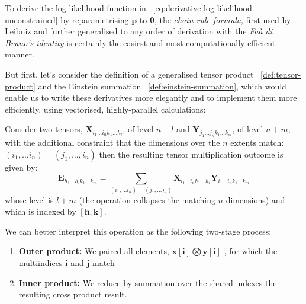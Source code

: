 \documentclass[long, final]{jobim}
\begin{document}
To derive the log-likelihood function in \equationname~\ref{eq:derivative-log-likelihood-unconstrained} by reparametrising $\boldsymbol{p}$ to  $\boldsymbol{\theta}$, the \textit{chain rule formula}, first used by Leibniz and further generalised to any order of derivation with the \textit{Faà di Bruno's identity} is certainly the easiest and most computationally efficient manner.

But first, let's consider the definition of a generalised tensor product ~\ref{def:tensor-product} and the Einstein summation ~\ref{def:einstein-summation}, which would enable us to write these derivatives more elegantly and to implement them more efficiently, using vectorised, highly-parallel calculations:
\begin{definition}
\label{def:tensor-product}
    Consider two tensors, $\boldsymbol{X}_{i_1 \ldots i_n h_1 \ldots h_l}$, of level $n + l$ and $\boldsymbol{Y}_{j_1 \ldots j_n k_1 \ldots k_m}$, of level $n + m$, with the additional constraint that the dimensions over the $n$ extents match:$(i_1, \ldots i_n)= (j_1, \ldots, i_n)$ then the resulting tensor multiplication outcome is given by:
$$
\boldsymbol{E}_{h_1\ldots h_l k_1 \ldots k_m} = \sum_{(i_1, \ldots i_n) =(j_1, \ldots j_n)} \boldsymbol{X}_{i_1 \ldots i_n h_1 \ldots h_l} \boldsymbol{Y}_{i_1 \ldots i_n k_1 \ldots k_m}
$$
whose level is $l + m$ (the operation collapses the matching $n$ dimensions) and which is indexed by $[\boldsymbol{h}, \boldsymbol{k}]$.

We can better interpret this operation as the following two-stage process:
\begin{enumerate}
\item \textbf{Outer product:} We paired all elements, $\boldsymbol{x}[\boldsymbol{i}] \bigotimes \boldsymbol{y}[\boldsymbol{i}]$ , for which the multiindices $\boldsymbol{i}$ and $\boldsymbol{j}$ match
\item  \textbf{Inner product:} We reduce by summation over the shared indexes the resulting cross product result.
\end{enumerate}




\end{definition}
\end{document}
